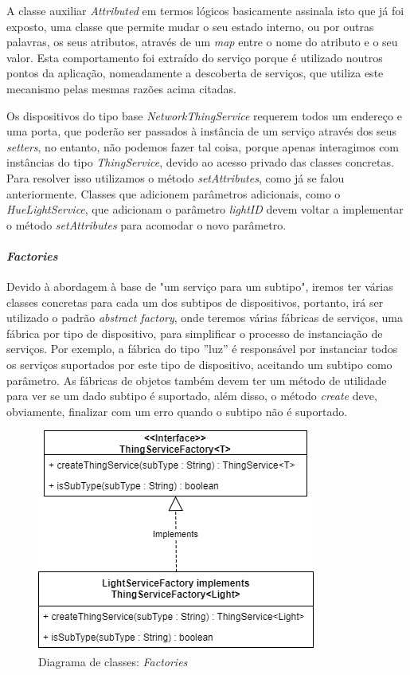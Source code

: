 A classe auxiliar \textit{Attributed} em termos lógicos basicamente assinala isto que já foi exposto, uma classe que permite mudar o seu estado interno, ou por outras palavras, os seus atributos, através de um \textit{map} entre o nome do atributo e o seu valor. Esta comportamento foi extraído do serviço porque é utilizado noutros pontos da aplicação, nomeadamente a descoberta de serviços, que utiliza este mecanismo pelas mesmas razões acima citadas.

Os dispositivos do tipo base \textit{NetworkThingService} requerem todos um endereço e uma porta, que poderão ser passados à instância de um serviço através dos seus \textit{setters}, no entanto, não podemos fazer tal coisa, porque apenas interagimos com instâncias do tipo \textit{ThingService}, devido ao acesso privado das classes concretas. Para resolver isso utilizamos o método \textit{setAttributes}, como já se falou anteriormente. Classes que adicionem parâmetros adicionais, como o \textit{HueLightService}, que adicionam o parâmetro \textit{lightID} devem voltar a implementar o método \textit{setAttributes} para acomodar o novo parâmetro.

%
%
%
%

\paragraph*{\textit{Factories}}

Devido à abordagem à base de "um serviço para um subtipo", iremos ter várias classes concretas para cada um dos subtipos de dispositivos, portanto, irá ser utilizado o padrão \textit{abstract factory}, onde teremos várias fábricas de serviços, uma fábrica por tipo de dispositivo, para simplificar o processo de instanciação de serviços. Por exemplo, a fábrica do tipo ''luz'' é responsável por instanciar todos os serviços suportados por este tipo de dispositivo, aceitando um subtipo como parâmetro. As fábricas de objetos também devem ter um método de utilidade para ver se um dado subtipo é suportado, além disso, o método \textit{create} deve, obviamente, finalizar com um erro quando o subtipo não é suportado.

\begin{figure}[H]
  \centering
        \includegraphics[scale=0.75]{img/hub-factories.png}
  \caption{Diagrama de classes: \textit{Factories}}
\end{figure}


